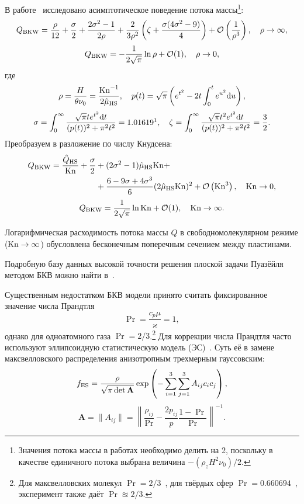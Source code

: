 В работе~\cite{Cercignani1965} исследовано асимптотическое поведение потока массы\footnote
{
	Значения потока массы в работах  необходимо делить на 2,
	поскольку в качестве единичного потока выбрана величина \(-(\rho_z H^2 \nu_0)/2\).
}:
\[ Q_{\rm{BKW}} = \frac{\rho}{12} + \frac{\sigma}{2} + \frac{2\sigma^2-1}{2\rho}
	+ \frac2{3\rho^2}\left( \zeta + \frac{\sigma(4\sigma^2-9)}{4} \right)
	+ \mathcal{O}\left(\frac1{\rho^3}\right), \quad \rho \rightarrow \infty, \]
\[	Q_{\rm{BKW}} = -\frac1{2\sqrt{\pi}}\ln{\rho} + \mathcal{O}(1), \quad \rho \rightarrow 0, \]
где
\[ \rho = \frac{H}{\theta\nu_0} = \frac{\mathrm{Kn}^{-1}}{2\hat{\mu}_{\rm{HS}}}, \quad
	p(t) = \sqrt{\pi}\left( e^{t^2} - 2t\int_0^te^{u^2}\mathrm{d} u \right), \]
\[ \sigma = \int_0^\infty\frac{\sqrt{\pi}te^{t^2}\dd t}{(p(t))^2+\pi^2t^2} = 1.01619\footnotemark, \quad
	\zeta = \int_0^\infty\frac{\sqrt{\pi}t^2e^{t^2}\dd t}{(p(t))^2+\pi^2t^2} = \frac3{2}. \]
Преобразуем в разложение по числу Кнудсена:
\begin{align*}
 Q_{\rm{BKW}} = \frac{\hat{Q}_{\rm{HS}}}{\mathrm{Kn}} + \frac{\sigma}2 &+ (2\sigma^2-1)\hat{\mu}_{\rm{HS}}\mathrm{Kn} + \\
	&+ \frac{6-9\sigma+4\sigma^3}{6}(2\hat{\mu}_{\rm{HS}}\mathrm{Kn})^2 + \mathcal{O}\left(\mathrm{Kn}^3\right) , \quad \mathrm{Kn} \rightarrow 0,
\end{align*}
\[	Q_{\rm{BKW}} = \frac1{2\sqrt{\pi}}\ln{\mathrm{Kn}} + \mathcal{O}(1), \quad \mathrm{Kn} \rightarrow \infty. \]

Логарифмическая расходимость потока массы \(Q\) в свободномолекулярном режиме (\(\mathrm{Kn}\rightarrow\infty\))
обусловлена бесконечным поперечным сечением между пластинами.

Подробную базу данных высокой точности решения плоской задачи Пуазёйля методом БКВ можно найти в~\cite{Sone1998}.

Существенным недостатком БКВ модели принято считать фиксированное значение числа Прандтля
\[ \Pr = \frac{c_p\mu}{\varkappa} = 1, \]
однако для одноатомного газа \(\Pr = 2/3\).\footnote
{
	Для максвелловских молекул \(\Pr = 2/3\)~\cite{Maxwell1879}, для твёрдых сфер \(\Pr = 0.660694\)~\cite{Pekeris1957},
	эксперимент также даёт \(\Pr \approxeq 2/3\).
}
Для коррекции числа Прандтля часто используют эллипсоидную статистическую модель (ЭС)~\cite{Holway1963,Holway1966}.
Суть её в замене максвелловского распределения анизотропным трехмерным гауссовским:
\[ f_{\rm{ES}} = \frac{\rho}{\sqrt{\pi\det\mathbf{A}}}\exp\left(-\sum\limits_{i=1}^{3}\sum\limits_{j=1}^{3} A_{ij}c_ic_j \right), \]
\[ \mathbf{A} = \|A_{ij}\| = \left\|\frac{\rho_{ij}}{\Pr} - \frac{2p_{ij}}{p}\frac{1-\Pr}{\Pr} \right\|^{-1}. \]

